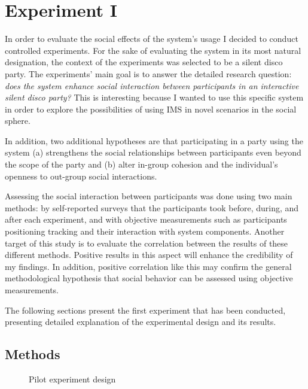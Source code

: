 \documentclass[a4paper,11pt]{article}
\begin{document}
{\section{Experiment I}

In order to evaluate the social effects of the system's usage I decided to conduct controlled experiments.
For the sake of evaluating the system in its most natural designation, the context of the experiments was selected to be a silent disco party.
The experiments' main goal is to answer the detailed research question: \emph{does the system enhance social interaction between participants in an interactive silent disco party?}
This is interesting because I wanted to use this specific system in order to explore the possibilities of using IMS in novel scenarios in the social sphere.

In addition, two additional hypotheses are that participating in a party using the system (a) strengthens the social relationships between participants even beyond the scope of the party and (b) alter in-group cohesion and the individual's openness to out-group social interactions.

Assessing the social interaction between participants was done using two main methods: by self-reported surveys that the participants took before, during, and after each experiment, and with objective measurements such as participants positioning tracking and their interaction with system components.
Another target of this study is to evaluate the correlation between the results of these different methods.
Positive results in this aspect will enhance the credibility of my findings.
In addition, positive correlation like this may confirm the general methodological hypothesis that social behavior can be assessed using objective measurements.

The following sections present the first experiment that has been conducted, presenting detailed explanation of the experimental design and its results.

\subsection{Methods}

\begin{figure}[!htb]
	\centering
	\def\svgwidth{0.95\columnwidth}
  	
	\caption{Pilot experiment design}\label{fig:pilot}
\end{figure}

}
\end{document}
